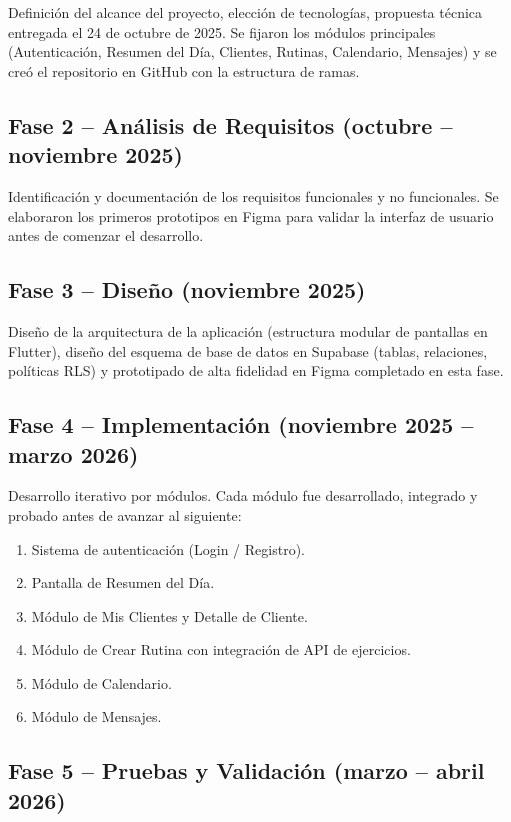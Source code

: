 Definición del alcance del proyecto, elección de tecnologías, propuesta técnica entregada el 24 de octubre de 2025. Se fijaron los módulos principales (Autenticación, Resumen del Día, Clientes, Rutinas, Calendario, Mensajes) y se creó el repositorio en GitHub con la estructura de ramas.

\subsection{Fase 2 -- Análisis de Requisitos (octubre -- noviembre 2025)}

Identificación y documentación de los requisitos funcionales y no funcionales. Se elaboraron los primeros prototipos en Figma para validar la interfaz de usuario antes de comenzar el desarrollo.

\subsection{Fase 3 -- Diseño (noviembre 2025)}

Diseño de la arquitectura de la aplicación (estructura modular de pantallas en Flutter), diseño del esquema de base de datos en Supabase (tablas, relaciones, políticas RLS) y prototipado de alta fidelidad en Figma completado en esta fase.

\subsection{Fase 4 -- Implementación (noviembre 2025 -- marzo 2026)}

Desarrollo iterativo por módulos. Cada módulo fue desarrollado, integrado y probado antes de avanzar al siguiente:

\begin{enumerate}
  \item Sistema de autenticación (Login / Registro).
  \item Pantalla de Resumen del Día.
  \item Módulo de Mis Clientes y Detalle de Cliente.
  \item Módulo de Crear Rutina con integración de API de ejercicios.
  \item Módulo de Calendario.
  \item Módulo de Mensajes.
\end{enumerate}

\subsection{Fase 5 -- Pruebas y Validación (marzo -- abril 2026)}

